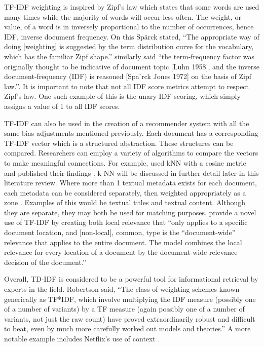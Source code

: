 TF-IDF weighting is inspired by Zipf’s law which states that some words are used many times while the majority of words will occur less often. The weight, or value, of a word is in inversely proportional to the number of occurrences, hence IDF, inverse document frequency. On this Spärck stated, ``The appropriate way of doing [weighting] is suggested by the term distribution curve for the vocabulary, which has the familiar Zipf shape.'' \citep{Wu:2008:Interpreting_tf_idf_term_weights} similarly said ``the term-frequency factor was originally thought to be indicative of document topic [Luhn 1958], and the inverse document-frequency (IDF) is reasoned [Spa ̈rck Jones 1972] on the basis of Zipf law.’’. It is important to note that not all IDF score metrics attempt to respect Zipf’s law. One such example of this is the unary IDF scoring, which simply assigns a value of 1 to all IDF scores.

TF-IDF can also be used in the creation of a recommender system with all the same bias adjustments mentioned previously. Each document has a corresponding TF-IDF vector which is a structured abstraction. These structures can be compared. Researchers can employ a variety of algorithms to compare the vectors to make meaningful connections. For example, \citeauthor{Meteren_usingcontent_based} used kNN with a cosine metric and published their findings \citep{Meteren_usingcontent_based}. k-NN will be discussed in further detail later in this literature review. Where more than 1 textual metadata exists for each document, each metadata can be considered separately, then weighted appropriately as a zone \citep{manning_raghavan_2008_scoring}. Examples of this would be textual titles and textual content. Although they are separate, they may both be used for matching purposes. \citet{Wu:2008:Interpreting_tf_idf_term_weights} provide a novel use of TF-IDF by creating both local relevance that ``only applies to a specific document location, and [non-local], common, type is the ``document-wide'' relevance that applies to the entire document. The model combines the local relevance for every location of a document by the document-wide relevance decision of the document.’’

Overall, TD-IDF is considered to be a powerful tool for informational retrieval by experts in the field. Robertson \citeyearpar{understanding_idf_2004} said, ``The class of weighting schemes known generically as TF*IDF, which involve multiplying the IDF measure (possibly one of a number of variants) by a TF measure (again possibly one of a number of variants, not just the raw count) have proved extraordinarily robust and difficult to beat, even by much more carefully worked out models and theories.'' A more notable example includes Netflix’s use of context \citep{Bell:2007:lessons_from_the_netflix_prize}.
